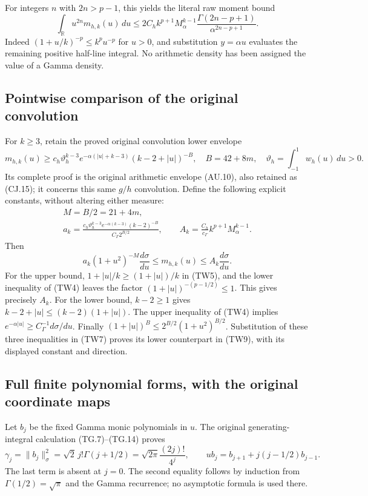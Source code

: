 \documentclass[11pt,a4paper]{article}
\begin{document}
For integers $n$ with $2n>p-1$, this yields the literal raw moment bound
\[
 \int_{\mathbb R}u^{2n}m_{h,k}(u)\,du
 \leq 2C_h k^{p+1}M_\alpha^{k-1}
 \frac{\Gamma(2n-p+1)}{\alpha^{2n-p+1}}.
 \tag{TW6}
\]
Indeed $(1+u/k)^{-p}\leq k^pu^{-p}$ for $u>0$, and substitution
$y=\alpha u$ evaluates the remaining positive half-line integral.
No arithmetic density has been assigned the value of a Gamma density.

\subsection{Pointwise comparison of the original convolution}

For $k\geq3$, retain the proved original convolution lower envelope
\[
 m_{h,k}(u)\geq c_h\vartheta_h^{k-3}
 e^{-\alpha(|u|+k-3)}(k-2+|u|)^{-B},\quad
 B=42+8m,\quad \vartheta_h=\int_{-1}^{1}w_h(u)\,du>0.
 \tag{TW7}
\]
Its complete proof is the original arithmetic envelope (AU.10), also
retained as (CJ.15); it concerns this same $g/h$ convolution.
Define the following explicit constants, without altering either measure:
\[
 \begin{gathered}
 M=B/2=21+4m,\\
 a_k=\frac{c_h\vartheta_h^{k-3}e^{-\alpha(k-3)}(k-2)^{-B}}
 {C_\Gamma 2^{B/2}},\qquad
 A_k=\frac{C_h}{c_\Gamma}k^{p+1}M_\alpha^{k-1}.
 \end{gathered}\tag{TW8}
\]
Then
\[
 \boxed{
 a_k(1+u^2)^{-M}\frac{d\sigma}{du}
 \leq m_{h,k}(u)\leq A_k\frac{d\sigma}{du}.}
 \tag{TW9}
\]
For the upper bound, $1+|u|/k\geq(1+|u|)/k$ in (TW5), and the
lower inequality of (TW4) leaves the factor
$(1+|u|)^{-(p-1/2)}\leq1$.  This gives precisely $A_k$.
For the lower bound, $k-2\geq1$ gives
$k-2+|u|\leq(k-2)(1+|u|)$.  The upper inequality of (TW4) implies
$e^{-\alpha|u|}\geq C_\Gamma^{-1}d\sigma/du$.
Finally $(1+|u|)^B\leq2^{B/2}(1+u^2)^{B/2}$.
Substitution of these three inequalities in (TW7) proves its lower
counterpart in (TW9), with its displayed constant and direction.

\subsection{Full finite polynomial forms, with the original coordinate maps}

Let $b_j$ be the fixed Gamma monic polynomials in $u$.  The original
generating-integral calculation (TG.7)--(TG.14) proves
\[
 \gamma_j=\|b_j\|_\sigma^2
 =\sqrt2\,j!\Gamma(j+1/2)
 =\sqrt{2\pi}\frac{(2j)!}{4^j},\qquad
 u b_j=b_{j+1}+j(j-1/2)b_{j-1}.
 \tag{TW10}
\]
The last term is absent at $j=0$.  The second equality follows by
induction from $\Gamma(1/2)=\sqrt\pi$ and the Gamma recurrence; no
asymptotic formula is used there.
\end{document}
